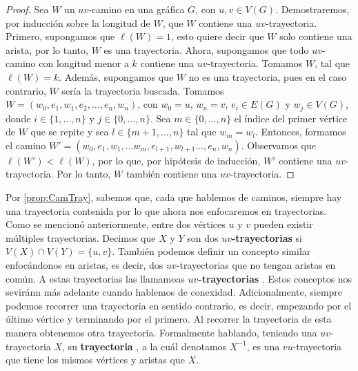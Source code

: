 \begin{proof}
    Sea $W$ un $uv$-camino en una gr\'afica $G$, con $u,v \in V(G)$.
    Demostraremos, por inducci\'on sobre la longitud de $W$, que $W$
    contiene una $uv$-trayectoria. Primero, supongamos que $\ell(W)=1$, esto
    quiere decir que $W$ solo contiene una arista, por lo tanto, $W$ es una
    trayectoria. Ahora, supongamos que todo $uv$-camino con longitud menor a
    $k$ contiene una $uv$-trayectoria. Tomamos $W$, tal que $\ell(W) = k$.
    Adem\'as, supongamos que $W$ no es una trayectoria, pues en el caso
    contrario, $W$ ser\'ia la trayectoria buscada. Tomamos $W=
    (w_0,e_1,w_1,e_2, \dots, e_n,w_n)$, con $w_0=u$, $w_n=v$, $e_i \in E(G)$
    y $w_j \in V(G)$, donde $i \in \{1, \dots, n\}$ y $j \in \{0, \dots,
    n\}$. Sea $m \in \{0, \dots, n\}$ el \'indice del primer v\'ertice de
    $W$ que se repite y sea $l \in \{m+1, \dots, n\}$ tal que $w_m = w_l$.
    Entonces, formamos el camino $W'= (w_0,e_1,w_1,\dots w_m, e_{l+1},
    w_{l+1} \dots, e_n,w_n)$. Observamos que $\ell(W')<\ell(W)$, por lo que,
    por hip\'otesis de inducci\'on, $W'$ contiene una $uv$-trayectoria. Por
    lo tanto, $W$ tambi\'en contiene una $uv$-trayectoria.
\end{proof}

Por \cref{prop:CamTray}, sabemos que, cada que hablemos de caminos, siempre hay
una trayectoria contenida por lo que ahora nos enfocaremos en trayectorias. Como
se mencion\'o anteriormente, entre dos v\'ertices $u$ y $v$ pueden existir
m\'ultiples trayectorias. Decimos que $X$ y $Y$ son dos
\textbf{$uv$-trayectorias}  si
$V(X)\cap V(Y)=\{u,v\}$. Tambi\'en podemos definir un concepto similar
enfoc\'andonos en aristas, es decir, dos $uv$-trayectorias que no tengan aristas
en com\'un. A estas trayectorias las llamamoas \textbf{$uv$-trayectorias}
. Estos conceptos nos sevir\'ann
m\'as adelante cuando hablemos de conexidad. Adicionalmente, siempre podemos
recorrer una trayectoria en sentido contrario, es decir, empezando por el
\'ultimo v\'ertice y terminando por el primero. Al recorrer la trayectoria de
esta manera obtenemos otra trayectoria. Formalmente hablando, teniendo una
$uv$-trayectoria $X$, su \textbf{trayectoria} ,
a la cu\'al denotamos $X^{-1}$, es una $vu$-trayectoria que tiene los mismos
v\'ertices y aristas que $X$.

